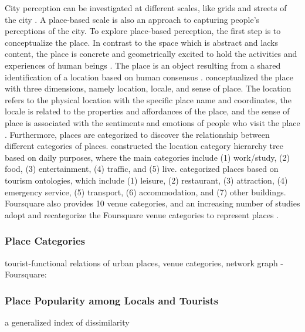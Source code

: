 \documentclass{article}
\begin{document}
City perception can be investigated at different scales, like grids and streets of the city \cite{bahrehdar_description_2018}. A place-based scale is also an approach to capturing people’s perceptions of the city. To explore place-based perception, the first step is to conceptualize the place. In contrast to the space which is abstract and lacks content, the place is concrete and geometrically excited to hold the activities and experiences of human beings \cite{tuan_place_1975}. The place is an object resulting from a shared identification of a location based on human consensus \cite{purves_places_2019}. \cite{agnew_space_2011} conceptualized the place with three dimensions, namely location, locale, and sense of place. The location refers to the physical location with the specific place name and coordinates, the locale is related to the properties and affordances of the place, and the sense of place is associated with the sentiments and emotions of people who visit the place \cite{bahrehdar_description_2018}. Furthermore, places are categorized to discover the relationship between different categories of places. \underline{\cite{liu_stccd_2020}} constructed the location category hierarchy tree based on daily purposes, where the main categories include (1) work/study, (2) food, (3) entertainment, (4) traffic, and (5) live. \cite{koirala_social_2015} categorized places based on tourism ontologies, which include (1) leisure, (2) restaurant, (3) attraction, (4) emergency service, (5) transport, (6) accommodation, and (7) other buildings. Foursquare also provides 10 venue categories, and an increasing number of studies adopt and recategorize the Foursquare venue categories to represent places \cite{ferreira_uncovering_2020,yang_identifying_2021}.


\subsubsection{Place Categories}

tourist-functional relations of urban places, venue categories, network graph - Foursquare: \cite{yang_identifying_2021}

\subsubsection{Place Popularity among Locals and Tourists}
a generalized index of dissimilarity \cite{sakoda_generalized_1981}
\end{document}
